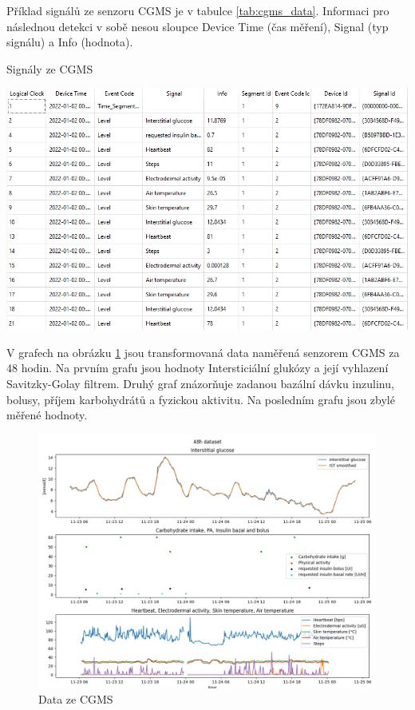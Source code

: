 Příklad signálů ze senzoru CGMS je v tabulce \ref{tab:cgms_data}. Informaci pro následnou detekci v sobě nesou sloupce Device Time (čas měření), Signal (typ signálu) a Info (hodnota).

\begin{table}[H]
\caption{Signály ze CGMS}
\label{tab:cgms_data}
\centering
\includegraphics[width=1\textwidth]{img/cho/cgms_data.png}
\end{table}

V grafech na obrázku \ref{fig:48h_dataset} jsou transformovaná data naměřená senzorem CGMS za 48 hodin. Na prvním grafu jsou hodnoty Intersticiální glukózy a její vyhlazení Savitzky-Golay filtrem. Druhý graf znázorňuje zadanou bazální dávku inzulinu, bolusy, příjem karbohydrátů a fyzickou aktivitu. Na posledním grafu jsou zbylé měřené hodnoty.

\begin{figure}[H]
\caption{Data ze CGMS}
\label{fig:48h_dataset}
\centering
\includegraphics[width=1\textwidth]{img/cho/48h_dataset.png}
\end{figure}


